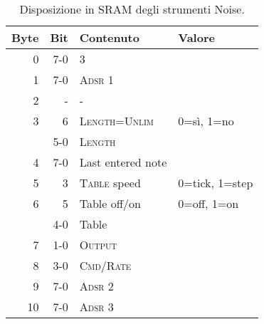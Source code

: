 \begin{table}
	\begin{center}
		\caption{Disposizione in SRAM degli strumenti Noise.}
		\label{tab:sram-noise}
		\begin{tabular}{r|r|l|l}
			\toprule
   Byte	& Bit	& Contenuto 		& Valore \\
\midrule
      0	& 7-0 	& 3 			& \\
      1 & 7-0 	& \textsc{Adsr 1} 	& \\
      2 & -   	& -  		 	& \\
      3 & 6   	& \textsc{Length=Unlim}	& 0=sì, 1=no \\
        & 5-0 	& \textsc{Length} 	& \\
      4 & 7-0 	& Last entered note 	& \\
      5 & 3     & \textsc{Table} speed	& 0=tick, 1=step \\
      6	& 5   	& Table off/on		& 0=off, 1=on \\
	& 4-0 	& Table			& \\
      7 & 1-0 	& \textsc{Output}	& \\
      8 & 3-0 	& \textsc{Cmd/Rate}	& \\
      9 & 7-0 	& \textsc{Adsr 2}	& \\
     10 & 7-0 	& \textsc{Adsr 3}	& \\
     \bottomrule
		\end{tabular}
	\end{center}
\end{table}
